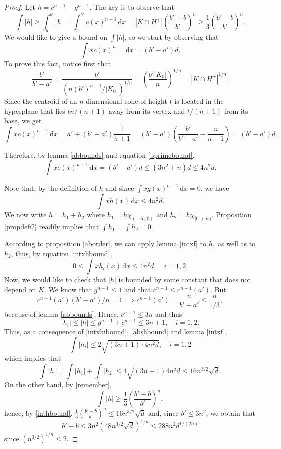 \documentclass[10pt,a4paper]{amsart}
\newcommand{\dx}[0]{\,\mathrm{d}x}
\begin{document}
\begin{proof} 
Let $h=c^{n-1}-g^{n-1}$. The key is to observe that
\begin{equation}\label{remember}
    \int |h|\geq \int_b^{b'}|h|=\int_{b}^{b'}c(x)^{n-1}\dx=|K\cap H^+|\left(\frac{b'-b}{b'}\right)^n\geq \frac 13\left(\frac{b'-b}{b'}\right)^n.
\end{equation}
We would like to give a bound on $\int |h|$, so we start by observing that
$$\int xc(x)^{n-1}\dx=(b'-a')d.$$
To prove this fact, notice first that $$
\frac{b'}{b'-a'}=\frac{b'}{(n(b')^{n-1}/|K_0|)^{1/n}}=\left(\frac{b'|K_0|}{n}\right)^{1/n}=|K\cap H^+|^{1/n}.$$ Since the centroid of an $n$-dimensional cone of height $t$ is located in the hyperplane that lies $t n/(n+1)$ away from its vertex and $t/(n+1)$ from its base, we get
$$\int xc(x)^{n-1}\dx=a'+(b'-a')\frac{1}{n+1}=(b'-a')\left(\frac{b'}{b'-a'}-\frac{n}{n+1}\right)=(b'-a')d.$$


Therefore, by lemma \ref{abbounds} and equation \eqref{bprimebound}, $$\int xc(x)^{n-1}\dx= (b'-a')d\leq (3n^2+n)d\leq 4n^2d.$$


Note that, by the definition of $h$ and since $\int xg(x)^{n-1}\dx=0$, we have
\begin{equation}\label{intxhbound}
    \int xh(x)\dx\leq 4n^2d.
\end{equation}
We now write $h=h_1+h_2$ where $h_1=h\chi_{(-\infty,0)}$ and $h_2=h\chi_{[0,+\infty)}$. Proposition \ref{propdefi2} readily implies that $\int h_1=\int h_2=0$.

According to proposition \ref{aborder}, we can apply lemma \ref{intxf} to $h_1$ as well as to $h_2$, thus, by equation \eqref{intxhbound},
\begin{equation}\label{intxhibound}
    0\leq \int xh_i(x)\dx\leq 4n^2d,\quad i=1,2.
\end{equation}
Now, we would like to check that $|h|$ is bounded by some constant that does not depend on $K$. We know that $g^{n-1}\leq 1$ and that $c^{n-1}\leq c^{n-1}(a')$. But $$c^{n-1}(a')(b'-a')/n=1\implies c^{n-1}(a')=\frac{n}{b'-a'}\leq \frac{n}{1/3},$$ because of lemma \ref{abbounds}. Hence, $c^{n-1}\leq 3n$ and thus
\begin{equation}\label{abshbound}
    |h_i|\leq |h|\leq g^{n-1}+c^{n-1}\leq 3n+1,\quad i=1,2.
\end{equation}
Thus, as a consequence of \eqref{intxhibound}, \eqref{abshbound} and lemma \ref{intxf},
$$\int |h_i|\leq 2\sqrt{(3n+1)\cdot 4n^2d},\quad i=1,2$$
which implies that
\begin{equation}\label{inthbound}
    \int |h| = \int |h_1|+\int |h_2|\leq 4\sqrt{(3n+1)4n^2d}\leq 16n^{3/2}\sqrt{d}.
\end{equation}
On the other hand, by \eqref{remember},
$$\int |h|\geq \frac 13\left(\frac{b'-b}{b'}\right)^n,$$
hence, by \eqref{inthbound}, $\frac 13\left(\frac{b'-b}{b'}\right)^n\leq 16n^{3/2}\sqrt{d}$ and, since $b'\leq 3n^2$, we obtain that
$$b'-b\leq 3n^2(48n^{3/2}\sqrt{d})^{1/n}\leq 288n^2 d^{1/(2n)}$$
since $(n^{3/2})^{1/n}\leq 2$.\end{proof}
\end{document}

